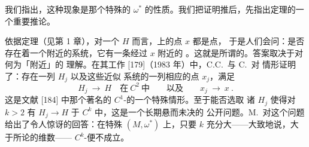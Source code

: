 我们指出，这种\trDynamics\trRigidity{}现象是那个特殊的\trSymplecticStructure{} $\omega^{*}$%
的性质。我们把证明推后，先指出\trHerman{}定理的一个重要推论。

依据\trPoincare{}\trRecurrence{}定理（见第 1 章），对一个\trHamiltonianSystem{} $H$%
而言，\trCompact\trEnergySurface{}上的\trAlmostEvery{}点 $x$ 都是\trRecurrence{}点，%
于是人们会问：是否存在着一个附近的系统，它有一条经过 $x$ 附近的%
\trPeriodic\trTrajectory。这就是所谓的\trClosingProblem。答案取决于对何为「附近」的%
理解。在其工作 [179]（1983 年）中，C.C.~\trPugh{}与 C.~\trRobinson{}对%
\trHamiltonian{}情形证明了：存在一列\trHamiltonianSystem{} $H_{j}$ 以及这些近似%
系统的一列相应的\trPeriodic{}点 $x_{j}$，满足
\[
H_{j}\ \to\ H\quad\text{在}\ C^{2}\ \text{中}\qquad\text{以及}\qquad x_{j}\ \to\ x\ .
\]
这是文献 [184] 中那个著名的 $C^{1}$-\trClosingLemma{}的一个特殊情形。至于能否选取%
诸 $H_{j}$ 使得对 $k>2$ 有 $H_{j}\to H$ 于 $C^{k}$ 中，这是一个长期悬而未决的%
公开问题。M.~\trHerman{}对这个问题给出了令人惊讶的回答：在特殊\trManifold{}%
$(M,\omega^{*})$ 上，只要 $k$ 充分大——大致地说，大于所论\trManifold{}的维数——%
$C^{k}$-\trClosingLemma{}便不成立。

